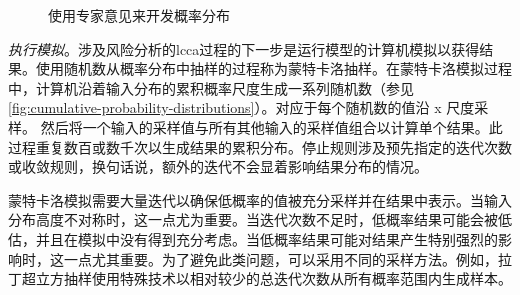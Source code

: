 \begin{figure}
  \caption{使用专家意见来开发概率分布}
  \label{fig:expert-opinion}
\end{figure}

\emph{执行模拟}。涉及风险分析的\acrlong*{lcca}过程的下一步是运行模型的计算机模拟以获得结果。使用随机数从概率分布中抽样的过程称为蒙特卡洛抽样。在蒙特卡洛模拟过程中，计算机沿着输入分布的累积概率尺度生成一系列随机数（参见 \cref{fig:cumulative-probability-distributions}）。对应于每个随机数的值沿 x 尺度采样。 然后将一个输入的采样值与所有其他输入的采样值组合以计算单个结果。此过程重复数百或数千次以生成结果的累积分布。停止规则涉及预先指定的迭代次数或收敛规则，换句话说，额外的迭代不会显着影响结果分布的情况。

蒙特卡洛模拟需要大量迭代以确保低概率的值被充分采样并在结果中表示。当输入分布高度不对称时，这一点尤为重要。当迭代次数不足时，低概率结果可能会被低估，并且在模拟中没有得到充分考虑。当低概率结果可能对结果产生特别强烈的影响时，这一点尤其重要。为了避免此类问题，可以采用不同的采样方法。例如，拉丁超立方抽样使用特殊技术以相对较少的总迭代次数从所有概率范围内生成样本。

